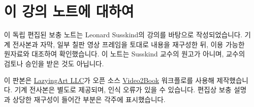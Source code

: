 \documentclass[11pt,oneside]{book}
\begin{document}
\frontmatter
\hypersetup{pageanchor=false}

\hypersetup{pageanchor=true}

\clearpage
\chapter{이 강의 노트에 대하여}
이 독립 편집된 보충 노트는 Leonard Susskind의 강의를 바탕으로 작성되었습니다. 기계 전사본과 자막, 일부 칠판 영상 프레임을 토대로 내용을 재구성한 뒤, 이용 가능한 원자료와 대조하여 확인했습니다. 이 노트는 Susskind 교수의 원고가 아니며, 교수의 검토나 승인을 받은 것도 아닙니다.

이 판본은 \href{https://lazying.art}{LazyingArt LLC}가 오픈 소스 \href{https://github.com/lachlanchen/Video2Book}{Video2Book} 워크플로를 사용해 제작했습니다.
기계 전사본은 별도로 제공되며, 인식 오류가 있을 수 있습니다. 편집상 보충 설명과 상당한 재구성이 들어간 부분은 각주에 표시했습니다.
\clearpage
\tableofcontents
\mainmatter
\graphicspath{{../../../generated_course_notes/supplementary/higgs_boson/2012_summer/chapters/lecture_01/}{../../../generated_course_notes/supplementary/higgs_boson/2012_summer/figures/}{../../../generated_course_notes/supplementary/higgs_boson/2012_summer/assets/}}
\end{document}
